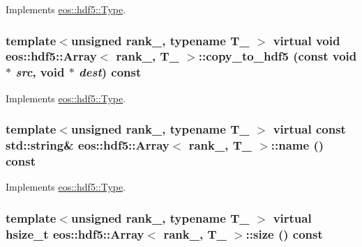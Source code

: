 Implements \hyperlink{structeos_1_1hdf5_1_1Type_a4d1073336bce1500533e69a1187acd66}{eos::hdf5::Type}.\hypertarget{classeos_1_1hdf5_1_1Array_a4f0adbcb6e7136436afa14aee7ebc5c9}{
\subsubsection[{copy\_\-to\_\-hdf5}]{\setlength{\rightskip}{0pt plus 5cm}template$<$unsigned rank\_\-, typename T\_\- $>$ virtual void {\bf eos::hdf5::Array}$<$ rank\_\-, T\_\- $>$::copy\_\-to\_\-hdf5 (const void $\ast$ {\em src}, \/  void $\ast$ {\em dest}) const}}
\label{classeos_1_1hdf5_1_1Array_a4f0adbcb6e7136436afa14aee7ebc5c9}


Implements \hyperlink{structeos_1_1hdf5_1_1Type_a30b665dc2adbe459feb640c61776b50a}{eos::hdf5::Type}.\hypertarget{classeos_1_1hdf5_1_1Array_aa533ea361fe7d7f589ea60ffee2120a5}{
\subsubsection[{name}]{\setlength{\rightskip}{0pt plus 5cm}template$<$unsigned rank\_\-, typename T\_\- $>$ virtual const std::string\& {\bf eos::hdf5::Array}$<$ rank\_\-, T\_\- $>$::name () const}}
\label{classeos_1_1hdf5_1_1Array_aa533ea361fe7d7f589ea60ffee2120a5}


Implements \hyperlink{structeos_1_1hdf5_1_1Type_a79de1c9f0444de59864107c388c23d2d}{eos::hdf5::Type}.\hypertarget{classeos_1_1hdf5_1_1Array_abbe03946de83c9b63d6fc35fc5a60c69}{
\subsubsection[{size}]{\setlength{\rightskip}{0pt plus 5cm}template$<$unsigned rank\_\-, typename T\_\- $>$ virtual hsize\_\-t {\bf eos::hdf5::Array}$<$ rank\_\-, T\_\- $>$::size () const}}
\label{classeos_1_1hdf5_1_1Array_abbe03946de83c9b63d6fc35fc5a60c69}


